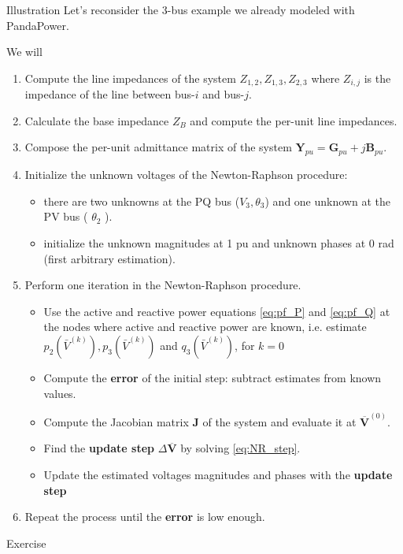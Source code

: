 \begin{frame}[allowframebreaks]{Illustration}
Let's reconsider the 3-bus example we already modeled with PandaPower.

We will 
\begin{enumerate}
  \item Compute the line impedances of the system $Z_{1,2}, Z_{1,3}, Z_{2,3}$ where $Z_{i, j}$ is the impedance of the line between bus-$i$ and bus-$j$.
  \item Calculate the base impedance $Z_{B}$ and compute the per-unit line impedances.
  \item Compose the per-unit admittance matrix of the system $\mathbf{Y}_{p u} = \mathbf{G}_{p u} + j\mathbf{B}_{p u}$.
  \item Initialize the unknown voltages of the Newton-Raphson procedure:
  \begin{itemize}
    \item there are two unknowns at the PQ bus ($V_{3}, \theta_{3}$) and one unknown at the PV bus ( $\theta_{2}$ ).
    \item initialize the unknown magnitudes at 1 pu and unknown phases at 0 rad (first arbitrary estimation).
  \end{itemize}
  \item Perform one iteration in the Newton-Raphson procedure.
  \begin{itemize}
    \item Use the active and reactive power equations \eqref{eq:pf_P} and \eqref{eq:pf_Q} at the nodes where active and reactive power are known, i.e. estimate $p_2\left(\bar{V}^{(k)}\right), p_3\left(\bar{V}^{(k)}\right)$ and $q_3\left(\bar{V}^{(k)}\right)$, for $k=0$
    \item Compute the \textbf{error} of the initial step: subtract estimates from known values.
    \item Compute the Jacobian matrix $\mathbf{J}$ of the system and evaluate it at $\overline{\mathbf{V}}^{(0)}$.
    \item Find the \textbf{update step} $\Delta \overline{\mathbf{V}}$ by solving \eqref{eq:NR_step}.
    \item Update the estimated voltages magnitudes and phases with the \textbf{update step}
  \end{itemize}
  \item Repeat the process until the \textbf{error} is low enough.
\end{enumerate}
\begin{block}{Exercise}
    \begin{itemize}

\end{itemize}
\end{block}
\end{frame}
